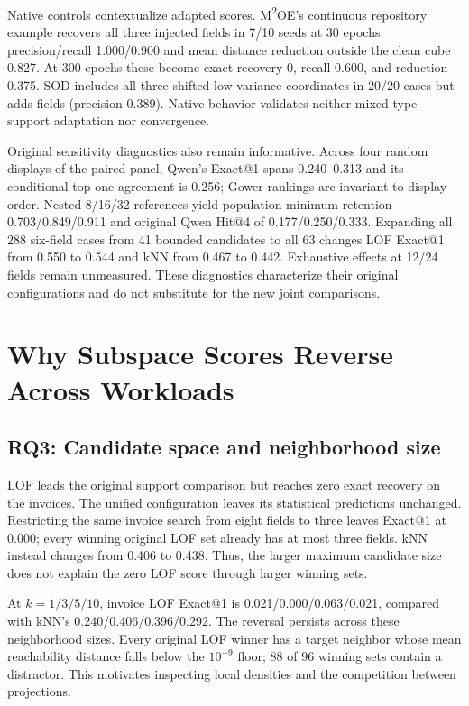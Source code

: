 \documentclass[conference]{IEEEtran}
\begin{document}
Native controls contextualize adapted scores. M\textsuperscript{2}OE's continuous repository example recovers all three injected fields in 7/10 seeds at 30 epochs: precision/recall 1.000/0.900 and mean distance reduction outside the clean cube 0.827. At 300 epochs these become exact recovery 0, recall 0.600, and reduction 0.375. SOD includes all three shifted low-variance coordinates in 20/20 cases but adds fields (precision 0.389). Native behavior validates neither mixed-type support adaptation nor convergence.

Original sensitivity diagnostics also remain informative. Across four random displays of the paired panel, Qwen's Exact@1 spans 0.240--0.313 and its conditional top-one agreement is 0.256; Gower rankings are invariant to display order. Nested 8/16/32 references yield population-minimum retention 0.703/0.849/0.911 and original Qwen Hit@4 of 0.177/0.250/0.333. Expanding all 288 six-field cases from 41 bounded candidates to all 63 changes LOF Exact@1 from 0.550 to 0.544 and kNN from 0.467 to 0.442. Exhaustive effects at 12/24 fields remain unmeasured. These diagnostics characterize their original configurations and do not substitute for the new joint comparisons.

\section{Why Subspace Scores Reverse Across Workloads}
\subsection{RQ3: Candidate space and neighborhood size}
LOF leads the original support comparison but reaches zero exact recovery on the invoices. The unified configuration leaves its statistical predictions unchanged. Restricting the same invoice search from eight fields to three leaves Exact@1 at 0.000; every winning original LOF set already has at most three fields. kNN instead changes from 0.406 to 0.438. Thus, the larger maximum candidate size does not explain the zero LOF score through larger winning sets.

At $k=1/3/5/10$, invoice LOF Exact@1 is 0.021/0.000/0.063/0.021, compared with kNN's 0.240/0.406/0.396/0.292. The reversal persists across these neighborhood sizes. Every original LOF winner has a target neighbor whose mean reachability distance falls below the $10^{-9}$ floor; 88 of 96 winning sets contain a distractor. This motivates inspecting local densities and the competition between projections.
\end{document}
